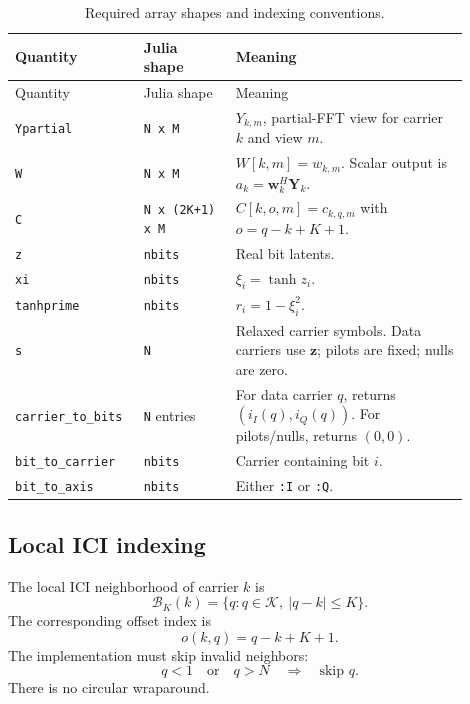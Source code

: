 \documentclass[11pt]{article}
\begin{document}
\begin{longtable}{@{}p{0.23\linewidth}p{0.19\linewidth}p{0.48\linewidth}@{}}
\caption{Required array shapes and indexing conventions.}\label{tab:layout}\\
\toprule
Quantity & Julia shape & Meaning \\
\midrule
\endfirsthead
\toprule
Quantity & Julia shape & Meaning \\
\midrule
\endhead
\bottomrule
\endfoot
\texttt{Ypartial} & \texttt{N x M} & $Y_{k,m}$, partial-FFT view for carrier $k$ and view $m$. \\
\texttt{W} & \texttt{N x M} & $W[k,m]=w_{k,m}$.  Scalar output is $a_k=\mathbf w_k^H\mathbf Y_k$. \\
\texttt{C} & \texttt{N x (2K+1) x M} & $C[k,o,m]=c_{k,q,m}$ with $o=q-k+K+1$. \\
\texttt{z} & \texttt{nbits} & Real bit latents. \\
\texttt{xi} & \texttt{nbits} & $\xi_i=\tanh z_i$. \\
\texttt{tanhprime} & \texttt{nbits} & $r_i=1-\xi_i^2$. \\
\texttt{s} & \texttt{N} & Relaxed carrier symbols.  Data carriers use $\bm z$; pilots are fixed; nulls are zero. \\
\texttt{carrier\_to\_bits} & \texttt{N} entries & For data carrier $q$, returns $(i_I(q),i_Q(q))$.  For pilots/nulls, returns $(0,0)$. \\
\texttt{bit\_to\_carrier} & \texttt{nbits} & Carrier containing bit $i$. \\
\texttt{bit\_to\_axis} & \texttt{nbits} & Either \texttt{:I} or \texttt{:Q}. \\
\end{longtable}

\subsection{Local ICI indexing}

The local ICI neighborhood of carrier $k$ is
\begin{equation}
\mathcal B_K(k)=\{q: q\in\mathcal K,\ |q-k|\le K\}.
\end{equation}
The corresponding offset index is
\begin{equation}
 o(k,q)=q-k+K+1.
\end{equation}
The implementation must skip invalid neighbors:
\begin{equation}
q<1 \quad\text{or}\quad q>N \quad\Longrightarrow\quad \text{skip } q.
\end{equation}
There is no circular wraparound.
\end{document}
